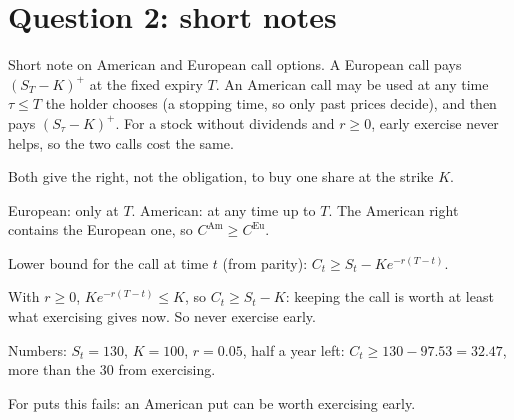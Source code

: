 \section{Question 2: short notes}

\begin{problem}[Q2(a)]
Short note on American and European call options.
\cardsays A European call pays $(S_T-K)^+$ at the fixed expiry $T$.
\cardsays An American call may be used at any time $\tau\le T$ the holder chooses (a stopping time, so only past prices decide), and then pays $(S_\tau-K)^+$.
\cardsays For a stock without dividends and $r\ge0$, early exercise never helps, so the two calls cost the same.
\working
\begin{steps}
\item Both give the right, not the obligation, to buy one share at the strike $K$.
\item European: only at $T$. American: at any time up to $T$. The American right contains the European one, so $C^{\mathrm{Am}}\ge C^{\mathrm{Eu}}$.
\item Lower bound for the call at time $t$ (from parity): $C_t\ge S_t-Ke^{-r(T-t)}$.
\item With $r\ge0$, $Ke^{-r(T-t)}\le K$, so $C_t\ge S_t-K$: keeping the call is worth at least what exercising gives now. So never exercise early.
\item Numbers: $S_t=130$, $K=100$, $r=0.05$, half a year left: $C_t\ge130-97.53=32.47$, more than the $30$ from exercising.
\item For puts this fails: an American put can be worth exercising early.
\end{steps}
\end{problem}

